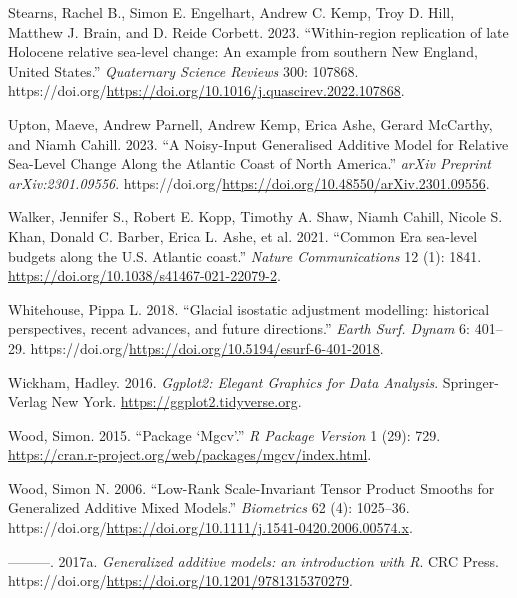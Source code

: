 \begin{CSLReferences}{1}{0}
\leavevmode{}%
Stearns, Rachel B., Simon E. Engelhart, Andrew C. Kemp, Troy D. Hill, Matthew J. Brain, and D. Reide Corbett. 2023. {``{Within-region replication of late Holocene relative sea-level change: An example from southern New England, United States}.''} \emph{Quaternary Science Reviews} 300: 107868. https://doi.org/\url{https://doi.org/10.1016/j.quascirev.2022.107868}.

\leavevmode{}%
Upton, Maeve, Andrew Parnell, Andrew Kemp, Erica Ashe, Gerard McCarthy, and Niamh Cahill. 2023. {``A Noisy-Input Generalised Additive Model for Relative Sea-Level Change Along the Atlantic Coast of North America.''} \emph{arXiv Preprint arXiv:2301.09556}. https://doi.org/\url{https://doi.org/10.48550/arXiv.2301.09556}.

\leavevmode{}%
Walker, Jennifer S., Robert E. Kopp, Timothy A. Shaw, Niamh Cahill, Nicole S. Khan, Donald C. Barber, Erica L. Ashe, et al. 2021. {``{Common Era sea-level budgets along the U.S. Atlantic coast}.''} \emph{Nature Communications} 12 (1): 1841. \url{https://doi.org/10.1038/s41467-021-22079-2}.

\leavevmode{}%
Whitehouse, Pippa L. 2018. {``{Glacial isostatic adjustment modelling: historical perspectives, recent advances, and future directions}.''} \emph{Earth Surf. Dynam} 6: 401--29. https://doi.org/\url{https://doi.org/10.5194/esurf-6-401-2018}.

\leavevmode{}%
Wickham, Hadley. 2016. \emph{Ggplot2: Elegant Graphics for Data Analysis}. Springer-Verlag New York. \url{https://ggplot2.tidyverse.org}.

\leavevmode{}%
Wood, Simon. 2015. {``Package {`Mgcv'}.''} \emph{R Package Version} 1 (29): 729. \url{https://cran.r-project.org/web/packages/mgcv/index.html}.

\leavevmode{}%
Wood, Simon N. 2006. {``{Low-Rank Scale-Invariant Tensor Product Smooths for Generalized Additive Mixed Models}.''} \emph{Biometrics} 62 (4): 1025--36. https://doi.org/\url{https://doi.org/10.1111/j.1541-0420.2006.00574.x}.

\leavevmode{}%
---------. 2017a. \emph{{Generalized additive models: an introduction with R}}. CRC Press. https://doi.org/\url{https://doi.org/10.1201/9781315370279}.


\end{CSLReferences}
